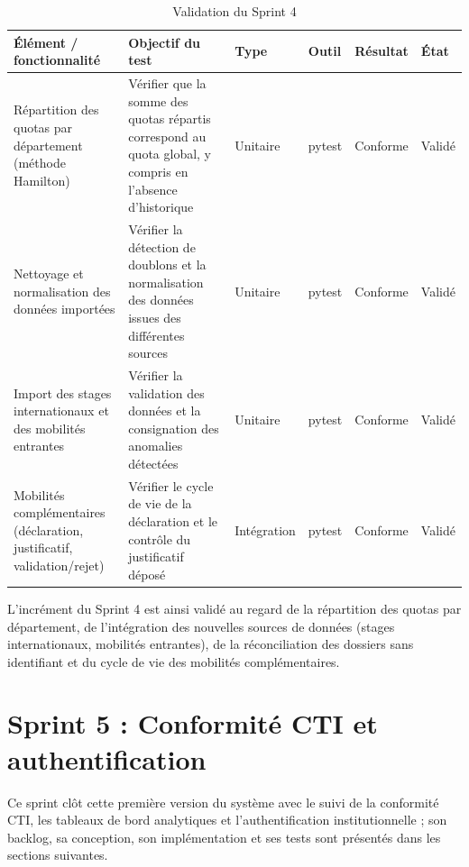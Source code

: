 \renewcommand{\arraystretch}{1.3}
\begin{table}[H]
\centering
\caption{Validation du Sprint 4}
\label{tab:validation-sprint4}
\footnotesize
\begin{tabular}{|p{2.8cm}|p{4.6cm}|p{1.5cm}|p{1.4cm}|p{1.8cm}|p{1.4cm}|}
\hline
\rowcolor{gray!20}
\textbf{Élément / fonctionnalité} & \textbf{Objectif du test} & \textbf{Type} & \textbf{Outil} & \textbf{Résultat} & \textbf{État} \\
\hline
Répartition des quotas par département (méthode Hamilton) &
Vérifier que la somme des quotas répartis correspond au quota global, y compris en l'absence d'historique &
Unitaire & pytest & Conforme & Validé \\
\hline
Nettoyage et normalisation des données importées &
Vérifier la détection de doublons et la normalisation des données issues des différentes sources &
Unitaire & pytest & Conforme & Validé \\
\hline
Import des stages internationaux et des mobilités entrantes &
Vérifier la validation des données et la consignation des anomalies détectées &
Unitaire & pytest & Conforme & Validé \\
\hline
Mobilités complémentaires (déclaration, justificatif, validation/rejet) &
Vérifier le cycle de vie de la déclaration et le contrôle du justificatif déposé &
Intégration & pytest & Conforme & Validé \\
\hline
\end{tabular}
\end{table}

L'incrément du Sprint 4 est ainsi validé au regard de la répartition des quotas par département, de l'intégration des nouvelles sources de données (stages internationaux, mobilités entrantes), de la réconciliation des dossiers sans identifiant et du cycle de vie des mobilités complémentaires.


\section{Sprint 5 : Conformité CTI et authentification}

Ce sprint clôt cette première version du système avec le suivi de la conformité CTI, les tableaux de bord analytiques et l'authentification institutionnelle ; son backlog, sa conception, son implémentation et ses tests sont présentés dans les sections suivantes.

